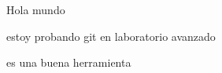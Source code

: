 \documentclass{article}
\begin{document}
Hola mundo


estoy probando git en laboratorio avanzado

es una buena herramienta
\end{document}
